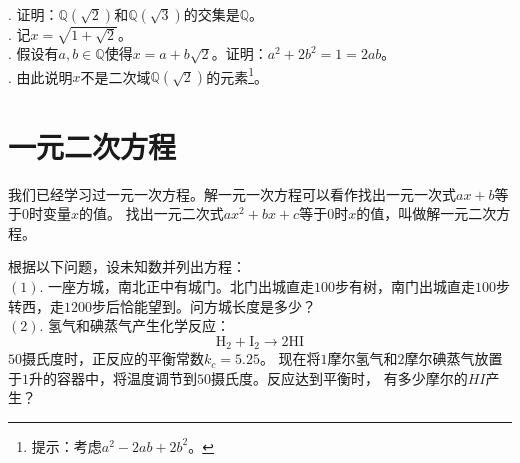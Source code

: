 \documentclass[12pt,UTF8]{ctexbook}
\begin{document}
\begin{xt}\label{xt:3-2-0}
    \mbox{}\\
    . 证明：$\mathbb{Q}(\sqrt{2})$和$\mathbb{Q}(\sqrt{3})$的交集是$\mathbb{Q}$。\\
    . 记$x = \sqrt{1 + \sqrt{2}}$。\\
    . 假设有$a,b\in\mathbb{Q}$使得$x = a + b\sqrt{2}$。证明：$a^2 + 2b^2 = 1 = 2ab$。\\
    . 由此说明$x$不是二次域$\mathbb{Q}(\sqrt{2})$的元素\footnote{提示：考虑$a^2 - 2ab + 2b^2$。}。
\end{xt}

\chapter{一元二次方程}
我们已经学习过一元一次方程。解一元一次方程可以看作找出一元一次式$ax + b$等于$0$时变量$x$的值。
找出一元二次式$ax^2 + bx + c$等于$0$时$x$的值，叫做解一元二次方程。

\begin{ex}\label{ex:4-0-0}
    根据以下问题，设未知数并列出方程：\\
    $(1).$ 一座方城，南北正中有城门。北门出城直走$100$步有树，南门出城直走$100$步转西，走$1200$步后恰能望到。问方城长度是多少？\\
    $(2).$ 氢气和碘蒸气产生化学反应：
    $$\mathrm{H}_2 + \mathrm{I}_2 \longrightarrow 2\mathrm{HI}$$
    $50$摄氏度时，正反应的平衡常数$k_c=5.25$。
    现在将$1$摩尔氢气和$2$摩尔碘蒸气放置于$1$升的容器中，将温度调节到$50$摄氏度。反应达到平衡时，
    有多少摩尔的$HI$产生？
\end{ex}
\end{document}
